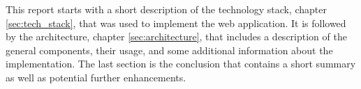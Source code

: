 This report starts with a short description of the technology stack, chapter \ref{sec:tech_stack}, that was used to implement the web application. It is followed by the architecture, chapter \ref{sec:architecture}, that includes a description of the general components, their usage, and some additional information about the implementation. The last section is the conclusion that contains a short summary as well as potential further enhancements.